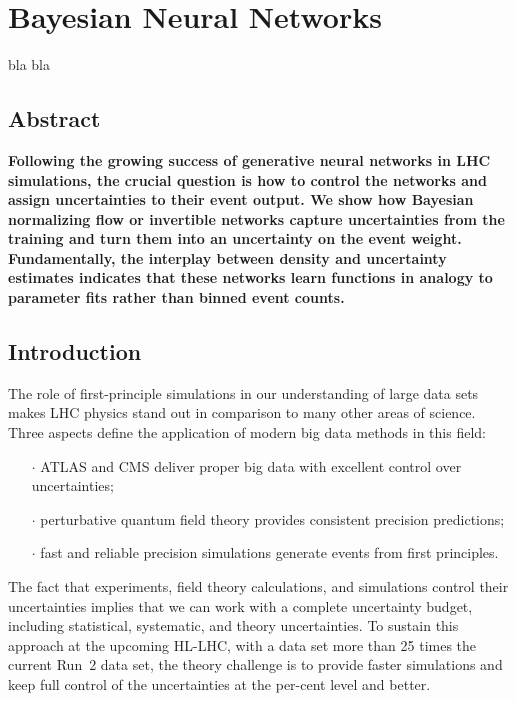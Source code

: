 %
%
%

\chapter{Bayesian Neural Networks}\label{chap:bnn}
bla bla
\enlargethispage{2ex}
\vspace*{-2pt}

\enlargethispage{2ex}

\section*{Abstract}
{\bf Following the growing success of generative neural networks in LHC
  simulations, the crucial question is how to control the networks
  and assign uncertainties to their event output. We show how
  Bayesian normalizing flow or invertible networks capture uncertainties from
  the training and turn them into an uncertainty on the
  event weight. Fundamentally, the interplay between density and
  uncertainty estimates indicates that these networks learn
  functions in analogy to parameter fits rather than binned event
  counts.}

\section{Introduction}
\label{sec:intro}

The role of first-principle simulations in our understanding of large
data sets makes LHC physics stand out in comparison to many other
areas of science. Three aspects define the application of modern big
data methods in this field:
%
\begin{itemize}
\item[$\cdot$] ATLAS and CMS deliver proper big data with excellent control over uncertainties;
\item[$\cdot$] perturbative quantum field theory provides consistent precision predictions;
\item[$\cdot$] fast and reliable precision simulations generate events from first principles.
\end{itemize}
%
The fact that experiments, field theory calculations, and simulations
control their uncertainties implies that we can work with a complete
uncertainty budget, including statistical, systematic, and theory
uncertainties. To sustain this approach at the upcoming HL-LHC, with a
data set more than 25 times the current Run~2 data set, the theory
challenge is to provide faster simulations and keep full control of
the uncertainties at the per-cent level and better.

